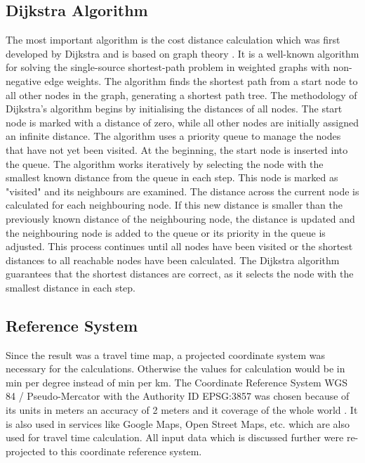 \documentclass[11pt, a4paper]{report}
\begin{document}
\subsection{Dijkstra Algorithm}
The most important algorithm is the cost distance calculation which was first developed by Dijkstra and is based on graph theory \citet{dijkstra_note_1959}. It is a well-known algorithm for solving the single-source shortest-path problem in weighted graphs with non-negative edge weights. The algorithm finds the shortest path from a start node to all other nodes in the graph, generating a shortest path tree.
The methodology of Dijkstra's algorithm begins by initialising the distances of all nodes. The start node is marked with a distance of zero, while all other nodes are initially assigned an infinite distance. The algorithm uses a priority queue to manage the nodes that have not yet been visited. At the beginning, the start node is inserted into the queue.
The algorithm works iteratively by selecting the node with the smallest known distance from the queue in each step. This node is marked as "visited" and its neighbours are examined. The distance across the current node is calculated for each neighbouring node. If this new distance is smaller than the previously known distance of the neighbouring node, the distance is updated and the neighbouring node is added to the queue or its priority in the queue is adjusted.
This process continues until all nodes have been visited or the shortest distances to all reachable nodes have been calculated. The Dijkstra algorithm guarantees that the shortest distances are correct, as it selects the node with the smallest distance in each step.

\subsection{Reference System}
Since the result was a travel time map, a projected coordinate system was necessary for the calculations. Otherwise the values for calculation would be in min per degree instead of min per km. The Coordinate Reference System WGS 84 / Pseudo-Mercator with the Authority ID EPSG:3857 was chosen because of its units in meters an accuracy of 2 meters and it coverage of the whole world \citet{international_association_of_oil__gas_producers_iogp_epsg_2024}. It is also used in services like Google Maps, Open Street Maps, etc. which are also used for travel time calculation. All input data which is discussed further were re-projected to this coordinate reference system. 
\end{document}
